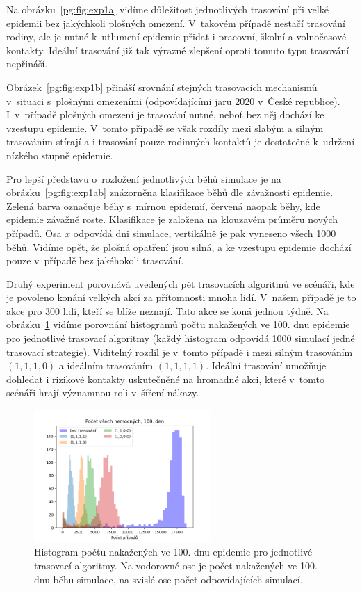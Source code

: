 Na obrázku~\ref{pg:fig:exp1a} vidíme důležitost jednotlivých trasování při
velké epidemii bez jakýchkoli plošných omezení. V~takovém případě
nestačí trasování rodiny, ale je nutné k~utlumení epidemie přidat i
pracovní, školní a volnočasové kontakty. Ideální trasování již tak výrazné zlepšení oproti tomuto typu trasování nepřináší.

Obrázek~\ref{pg:fig:exp1b} přináší srovnání stejných trasovacích
mechanismů v~situaci s~plošný\-mi omezeními (odpovídajícími jaru 2020
v~České republice). I~v~případě plošných omezení je trasování nutné,
neboť bez něj dochází ke vzestupu epidemie. V~tomto případě
se však rozdíly mezi slabým a silným trasováním stírají a i trasování
pouze rodinných kontaktů je dostatečné k~udržení nízkého stupně epidemie. 

Pro lepší představu o~rozložení jednotlivých běhů simulace je na
obrázku~\ref{pg:fig:exp1ab} znázorněna klasifikace běhů dle závažnosti
epidemie. Zelená barva označuje běhy s~mírnou epidemií, červená naopak běhy,
kde epidemie závažně roste. Klasifikace je založena na klouzavém průměru
nových případů. Osa $x$ odpovídá dni simulace, vertikálně je pak vyneseno
všech 1000 běhů. Vidíme opět, že plošná opatření jsou silná, a ke vzestupu
epidemie dochází pouze v~případě bez jakéhokoli trasování. 


Druhý experiment porovnává uvedených pět trasovacích algoritmů ve
scénáři, kde je povoleno konání velkých akcí za přítomnosti mnoha
lidí. V~našem případě je to akce pro 300 lidí, kteří se blíže
neznají. Tato akce se koná jednou týdně. Na obrázku~\ref{pg:fig:exp2}
vidíme porovnání histogramů počtu nakažených ve 100. dnu epidemie pro
jednotlivé trasovací algoritmy (každý histogram odpovídá 1000
simulací jedné trasovací strategie). Viditelný rozdíl je v~tomto
případě i mezi silným trasováním $(1, 1, 1, 0)$ a ideálním trasováním
$(1, 1, 1, 1)$. Ideální trasování umožňuje dohledat i rizikové
kontakty uskutečněné na hromadné akci, které v~tomto scénáři hrají
významnou roli v~šíření nákazy.

\begin{figure}[ht!]
  \centering
  \includegraphics[width=0.6\textwidth]{pic/histogram_party2.png}
  \caption{Histogram  počtu nakažených ve 100. dnu epidemie pro jednotlivé trasovací algoritmy.
  Na vodorovné ose je počet nakažených ve 100. dnu běhu simulace, na svislé ose počet odpovídajících simulací.}
  \label{pg:fig:exp2}
\end{figure}


